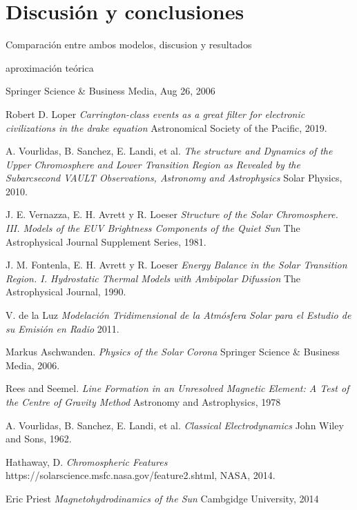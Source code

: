 \documentclass[9pt]{book}
\begin{document}
\chapter{Discusi\'on y conclusiones}
Comparaci\'on entre ambos modelos, discusion y resultados

aproximaci\'on te\'orica
 



Springer Science \& Business Media, Aug 26, 2006

\begin{thebibliography}{9}

Robert D. Loper
\textit{Carrington-class events as a great filter for electronic civilizations in the drake equation} 
Astronomical Society of the Pacific, 2019.

A. Vourlidas, B. Sanchez, E. Landi, et al.
\textit{The structure and Dynamics of the Upper Chromosphere and Lower Transition Region as Revealed by the Subarcsecond VAULT Observations, Astronomy and Astrophysics} 
Solar Physics, 2010.

J. E. Vernazza, E. H. Avrett y R. Loeser
\textit{Structure of the Solar Chromosphere. III. Models of the EUV Brightness Components of the Quiet Sun} 
The Astrophysical Journal Supplement Series, 1981.

J. M. Fontenla, E. H. Avrett y R. Loeser
\textit{Energy Balance in the Solar Transition Region. I. Hydrostatic Thermal Models with Ambipolar Difussion} 
The Astrophysical Journal, 1990.

V. de la Luz
\textit{Modelaci\'on Tridimensional de la Atm\'osfera Solar para el Estudio de su Emisi\'on en Radio} 
2011.

Markus Aschwanden. 
\textit{Physics of the Solar Corona} 
Springer Science \& Business Media, 2006.

Rees and Seemel.
\textit{Line Formation in an Unresolved Magnetic Element: A Test of the Centre of Gravity Method} 
Astronomy and Astrophysics, 1978

A. Vourlidas, B. Sanchez, E. Landi, et al.
\textit{Classical Electrodynamics} 
John Wiley and Sons, 1962.

Hathaway, D.
\textit{Chromospheric Features} 
https://solarscience.msfc.nasa.gov/feature2.shtml, NASA, 2014.

Eric Priest
\textit{Magnetohydrodinamics of the Sun} 
 Cambgidge University, 2014


\end{thebibliography}
\end{document}
